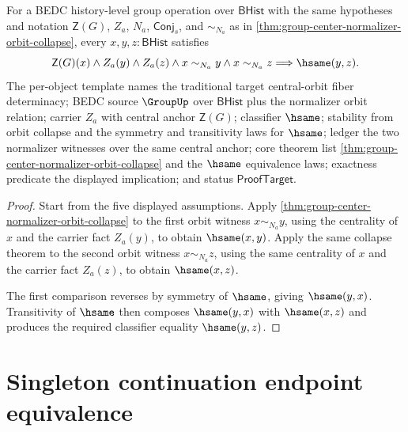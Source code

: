 \begin{theorem}
\label{thm:group-center-normalizer-orbit-fiber-determinacy}
For a BEDC history-level group operation over $\mathsf{BHist}$ with the same
hypotheses and notation $\mathsf{Z}(G)$, $Z_a$, $N_a$, $\mathsf{Conj}_s$, and
$\sim_{N_a}$ as in
\autoref{thm:group-center-normalizer-orbit-collapse}, every
$x,y,z:\mathsf{BHist}$ satisfies
$$
\mathsf{Z}(G)(x)\land Z_a(y)\land Z_a(z)\land x\sim_{N_a}y\land
x\sim_{N_a}z
\Longrightarrow
\hsame(y,z).
$$
The per-object template names the traditional target central-orbit fiber
determinacy; BEDC source $\GroupUp$ over $\mathsf{BHist}$ plus the normalizer
orbit relation; carrier $Z_a$ with central anchor $\mathsf{Z}(G)$; classifier
$\hsame$; stability from orbit collapse and the symmetry and transitivity laws
for $\hsame$; ledger the two normalizer witnesses over the same central anchor;
core theorem list \autoref{thm:group-center-normalizer-orbit-collapse} and the
$\hsame$ equivalence laws; exactness predicate the displayed implication; and
status $\mathsf{ProofTarget}$.
\end{theorem}
\begin{proof}
Start from the five displayed assumptions. Apply
\autoref{thm:group-center-normalizer-orbit-collapse} to the first orbit witness
$x\sim_{N_a}y$, using the centrality of $x$ and the carrier fact $Z_a(y)$, to
obtain $\hsame(x,y)$. Apply the same collapse theorem to the second orbit
witness $x\sim_{N_a}z$, using the same centrality of $x$ and the carrier fact
$Z_a(z)$, to obtain $\hsame(x,z)$.

The first comparison reverses by symmetry of $\hsame$, giving $\hsame(y,x)$.
Transitivity of $\hsame$ then composes $\hsame(y,x)$ with $\hsame(x,z)$ and
produces the required classifier equality $\hsame(y,z)$.
\end{proof}

\section{Singleton continuation endpoint equivalence}
\label{sec:group-singleton-continuation-endpoint-equivalence}

